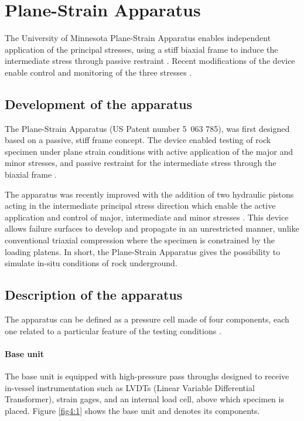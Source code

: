 \section{Plane-Strain Apparatus}

The University of Minnesota Plane-Strain Apparatus enables independent application of the principal stresses, using a stiff biaxial frame to induce the intermediate stress through passive restraint \cite{Labuz1996}. Recent modifications of the device enable control and monitoring of the three stresses \cite{Zeng2019}.

\subsection{Development of the apparatus}

The Plane-Strain Apparatus (US Patent number 5 063 785), was first designed based on a passive, stiff frame concept. The device enabled testing of rock specimen under plane strain conditions with active application of the major and minor stresses, and passive restraint for the intermediate stress through the biaxial frame \cite{Labuz1996}. 

The apparatus was recently improved with the addition of two hydraulic pistons acting in the intermediate principal stress direction which enable the active application and control of major, intermediate and minor stresses \cite{Zeng2019}. This device allows failure surfaces to develop and propagate in an unrestricted manner, unlike conventional triaxial compression where the specimen is constrained by the loading platens. In short, the Plane-Strain Apparatus gives the possibility to simulate in-situ conditions of rock underground. 

\subsection{Description of the apparatus}

The apparatus can be defined as a pressure cell made of four components, each one related to a particular feature of the testing conditions \cite{Labuz1996,Zeng2019}. 

\paragraph{Base unit} 
The base unit is equipped with high-pressure pass throughs designed to receive in-vessel instrumentation such as LVDTs (Linear Variable Differential Transformer), strain gages, and an internal load cell, above which specimen is placed. Figure \ref{fig4:1} shows the base unit and denotes its components. 

